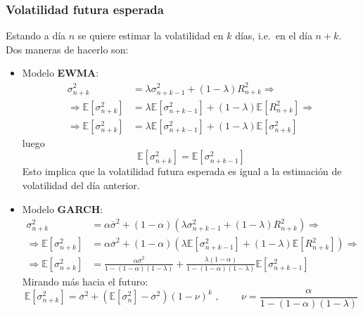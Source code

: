 \subsubsection{Volatilidad futura esperada}
Estando a día $n$ se quiere estimar la volatilidad en $k$ días, i.e.\ en el día $n+k$. Dos maneras de hacerlo son:
\begin{itemize}
    \item Modelo \textbf{EWMA}:
    \begin{align*}
        \sigma_{n+k}^2 &= \lambda \sigma_{n+k-1}^2 + (1 - \lambda) R_{n+k}^2 \Rightarrow \\
        \Rightarrow \mathbb{E}[\sigma_{n+k}^2] &= \lambda \mathbb{E}[\sigma_{n+k-1}^2] + (1 - \lambda) \mathbb{E}[R_{n+k}^2] \Rightarrow \\
        \Rightarrow \mathbb{E}[\sigma_{n+k}^2] &= \lambda \mathbb{E}[\sigma_{n+k-1}^2] + (1 - \lambda) \mathbb{E}[\sigma_{n+k}^2]
    \end{align*}
    luego
    \[
    \boxed{\mathbb{E}[\sigma_{n+k}^2] = \mathbb{E}[\sigma_{n+k-1}^2]}
    \]
    Esto implica que la volatilidad futura esperada es igual a la estimación de volatilidad del día anterior.
    \item Modelo \textbf{GARCH}:
    \begin{align*}
        \sigma_{n+k}^2 &= \alpha \overline{\sigma}^2 + (1 - \alpha) \left( \lambda \sigma_{n+k-1}^2 + (1 - \lambda) R_{n+k}^2 \right) \Rightarrow \\
        \Rightarrow \mathbb{E}[\sigma_{n+k}^2] &= \alpha \overline{\sigma}^2 + (1 - \alpha) \left( \lambda \mathbb{E}[\sigma_{n+k-1}^2] + (1 - \lambda) \mathbb{E}[R_{n+k}^2] \right) \Rightarrow\\
        \Rightarrow \mathbb{E}[\sigma_{n+k}^2] &= \frac{\alpha \overline{\sigma}^2}{1 - (1 - \alpha)(1 - \lambda)} + \frac{\lambda (1 - \alpha)}{1 - (1 - \alpha)(1 - \lambda)} \mathbb{E}[\sigma_{n+k-1}^2]
    \end{align*}
    Mirando más hacia el futuro:
    \[
    \boxed{\mathbb{E}[\sigma_{n+k}^2] = \overline{\sigma}^2 + \left( \mathbb{E}[\sigma_{n}^2] - \overline{\sigma}^2 \right) (1 - \nu)^k} \text{ , } \qquad \nu = \frac{\alpha}{1 - (1 - \alpha)(1 - \lambda)}
    \]
\end{itemize}









